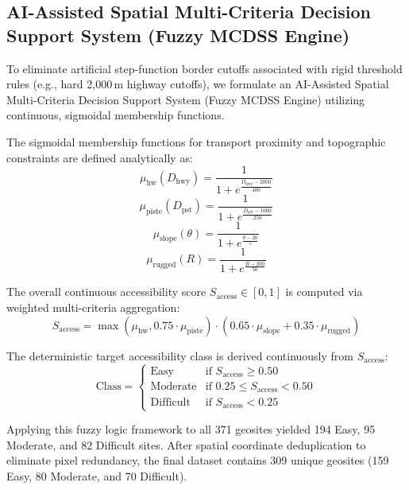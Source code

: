 \documentclass[11pt,twocolumn,a4paper]{article}
\begin{document}
\subsection{AI-Assisted Spatial Multi-Criteria Decision Support System (Fuzzy MCDSS Engine)}
To eliminate artificial step-function border cutoffs associated with rigid threshold rules (e.g., hard 2,000\,m highway cutoffs), we formulate an AI-Assisted Spatial Multi-Criteria Decision Support System (Fuzzy MCDSS Engine) utilizing continuous, sigmoidal membership functions.

The sigmoidal membership functions for transport proximity and topographic constraints are defined analytically as:
\begin{equation}
\mu_{\text{hw}}(D_{\text{hwy}}) = \frac{1}{1 + e^{\frac{D_{\text{hwy}} - 2000}{400}}}
\end{equation}
\begin{equation}
\mu_{\text{piste}}(D_{\text{pst}}) = \frac{1}{1 + e^{\frac{D_{\text{pst}} - 1000}{250}}}
\end{equation}
\begin{equation}
\mu_{\text{slope}}(\theta) = \frac{1}{1 + e^{\frac{\theta - 20}{5}}}
\end{equation}
\begin{equation}
\mu_{\text{rugged}}(R) = \frac{1}{1 + e^{\frac{R - 200}{50}}}
\end{equation}

The overall continuous accessibility score $S_{\text{access}} \in [0, 1]$ is computed via weighted multi-criteria aggregation:
\begin{equation}
S_{\text{access}} = \max\left(\mu_{\text{hw}}, 0.75 \cdot \mu_{\text{piste}}\right) \cdot \left(0.65 \cdot \mu_{\text{slope}} + 0.35 \cdot \mu_{\text{rugged}}\right)
\end{equation}

The deterministic target accessibility class is derived continuously from $S_{\text{access}}$:
\begin{equation}
\text{Class} = \begin{cases}
\text{Easy} & \text{if } S_{\text{access}} \ge 0.50 \\
\text{Moderate} & \text{if } 0.25 \le S_{\text{access}} < 0.50 \\
\text{Difficult} & \text{if } S_{\text{access}} < 0.25
\end{cases}
\end{equation}

Applying this fuzzy logic framework to all 371 geosites yielded 194 Easy, 95 Moderate, and 82 Difficult sites. After spatial coordinate deduplication to eliminate pixel redundancy, the final dataset contains 309 unique geosites (159 Easy, 80 Moderate, and 70 Difficult).
\end{document}
